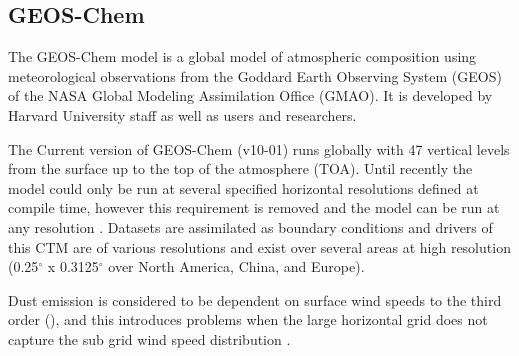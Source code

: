 \subsection{GEOS-Chem}

The GEOS-Chem model is a global model of atmospheric composition using meteorological observations from the Goddard Earth Observing System (GEOS) of the NASA Global Modeling Assimilation Office (GMAO). It is developed by Harvard University staff as well as users and researchers. 

The Current version of GEOS-Chem (v10-01) runs globally with 47 vertical levels from the surface up to the top of the atmosphere (TOA). 
Until recently the model could only be run at several specified horizontal resolutions defined at compile time, however this requirement is removed and the model can be run at any resolution \cite{Long_2015}.
Datasets are assimilated as boundary conditions and drivers of this CTM are of various resolutions and exist over several areas at high resolution (0.25$^{\circ}$ x 0.3125$^{\circ}$ over North America, China, and Europe).

Dust emission is considered to be dependent on surface wind speeds to the third order (\cite{Duncan_Fairlie_2007}), and this introduces problems when the large horizontal grid does not capture the sub grid wind speed distribution \cite{Ridley_2013}.

  
  